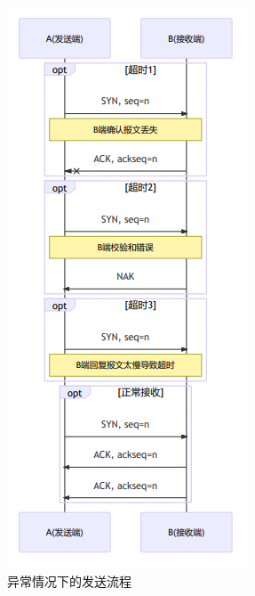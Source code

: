 \documentclass[UTF8,a4paper,10pt]{ctexart}
\begin{document}
\begin{figure}[H]
    \centering
    \includegraphics[scale=1.0]{计网5.png}
    \caption{异常情况下的发送流程}
    \label{fig:5}
\end{figure}
\end{document}
